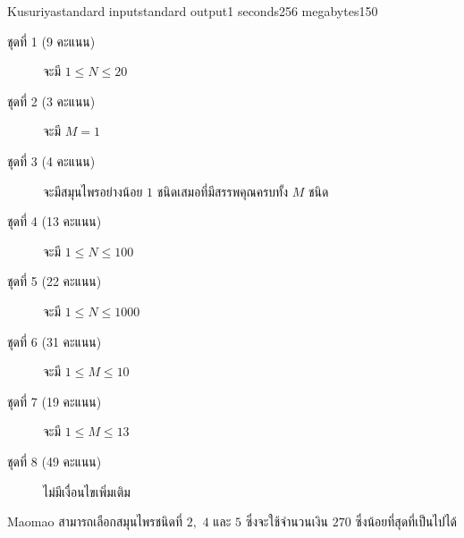 \documentclass[11pt,a4paper]{article}
\begin{document}
\begin{problem}{Kusuriya}{standard input}{standard output}{1 seconds}{256 megabytes}{150}
\begin{description}

\item[ชุดที่ 1 (9 คะแนน)] จะมี $1\leq N\leq 20$
\item[ชุดที่ 2 (3 คะแนน)] จะมี $M=1$
\item[ชุดที่ 3 (4 คะแนน)] จะมีสมุนไพรอย่างน้อย $1$ ชนิดเสมอที่มีสรรพคุณครบทั้ง $M$ ชนิด
\item[ชุดที่ 4 (13 คะแนน)] จะมี $1\leq N\leq 100$
\item[ชุดที่ 5 (22 คะแนน)] จะมี $1\leq N\leq 1000$
\item[ชุดที่ 6 (31 คะแนน)] จะมี $1\leq M\leq 10$
\item[ชุดที่ 7 (19 คะแนน)] จะมี $1\leq M\leq 13$
\item[ชุดที่ 8 (49 คะแนน)] ไม่มีเงื่อนไขเพิ่มเติม

\end{description}

\Examples

\begin{example}
%
\end{example}

\Note

Maomao สามารถเลือกสมุนไพรชนิดที่ $2,$ $4$ และ $5$ ซึ่งจะใช้จำนวนเงิน $270$ ซึ่งน้อยที่สุดที่เป็นไปได้

\end{problem}
\end{document}
